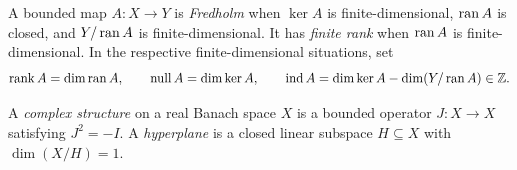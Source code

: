 \begin{definition}\label{def:fredholm-rank}
A bounded map $A:X\to Y$ is \emph{Fredholm} when $\ker A$ is finite-dimensional,
$\operatorname{ran} A$ is closed, and $Y/\operatorname{ran} A$ is finite-dimensional. It has \emph{finite rank} when
$\operatorname{ran} A$ is finite-dimensional. In the respective finite-dimensional situations, set
\[
  \operatorname{rank} A=\dim\operatorname{ran} A,
  \qquad
  \operatorname{null}A=\dim\ker A,
  \qquad
  \operatorname{ind}A=\dim\ker A-\dim(Y/\operatorname{ran} A)\in\mathbb Z.
\]
\leanok
\end{definition}

\begin{definition}\label{def:complex-hyperplane}
A \emph{complex structure} on a real Banach space $X$ is a bounded operator $J:X\to X$ satisfying
$J^2=-I$. A \emph{hyperplane} is a closed linear subspace $H\subseteq X$ with
$\dim(X/H)=1$.
\leanok
\end{definition}
